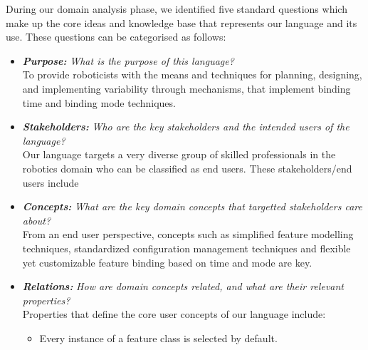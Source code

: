 \documentclass[conference]{IEEEtran}
\begin{document}
During our domain analysis phase, we identified five standard questions which make up the core ideas and knowledge base that represents our language and its use. These questions can be categorised as follows:
    \begin{itemize}
        \item \textit{\textbf{Purpose:}} \textit{What is the purpose of this language?}\\
        To provide roboticists with the means and techniques for planning, designing, and implementing variability through mechanisms, that implement binding time and binding mode techniques.
        \item \textit{\textbf{Stakeholders:}} \textit{Who are the key stakeholders and the intended users of the language?}\\ Our language targets a very diverse group of skilled professionals in the robotics domain who can be classified as end users. These stakeholders/end users include 
        \item \textit{\textbf{Concepts:}} \textit{What are the key domain concepts that targetted stakeholders care about?}\\ From an end user perspective, concepts such as simplified feature modelling techniques, standardized configuration management techniques and flexible yet customizable feature binding based on time and mode are key.
        \item \textit{\textbf{Relations:}} \textit{How are domain concepts related, and what are their relevant properties?}\\
        Properties that define the core user concepts of our language include:
        \begin{itemize}
            \item Every instance of a feature class is selected by default.

\end{itemize}
\end{itemize}
\end{document}
